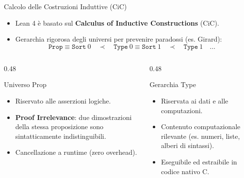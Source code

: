 
\begin{frame}{Calcolo delle Costruzioni Induttive (CiC)}
    \begin{itemize}
        \item Lean 4 è basato sul \textbf{Calculus of Inductive Constructions} (CiC).
        \item Gerarchia rigorosa degli universi per prevenire paradossi (es. Girard):
        \[
        \mathtt{Prop} \equiv \mathtt{Sort}\ 0 \quad\prec\quad \mathtt{Type}\ 0 \equiv \mathtt{Sort}\ 1 \quad\prec\quad \mathtt{Type}\ 1 \quad\dots
        \]
    \end{itemize}

    \vskip 0.20cm
    \begin{columns}[t, onlytextwidth]
        \begin{column}{0.48\textwidth}
            \begin{block}{Universo Prop}
                \begin{minipage}[t][2.5cm][t]{\linewidth}
                    \begin{itemize}
                        \item Riservato alle asserzioni logiche.
                        \item \textbf{Proof Irrelevance}: due dimostrazioni della stessa proposizione sono sintatticamente indistinguibili.
                        \item Cancellazione a runtime (zero overhead).
                    \end{itemize}
                \end{minipage}
            \end{block}
        \end{column}

        \begin{column}{0.48\textwidth}
            \begin{block}{Gerarchia Type}
                \begin{minipage}[t][2.5cm][t]{\linewidth}
                    \begin{itemize}
                        \item Riservata ai dati e alle computazioni.
                        \item Contenuto computazionale rilevante (es. numeri, liste, alberi di sintassi).
                        \item Eseguibile ed estraibile in codice nativo C.
                    \end{itemize}
                \end{minipage}
            \end{block}
        \end{column}
    \end{columns}
\end{frame}

